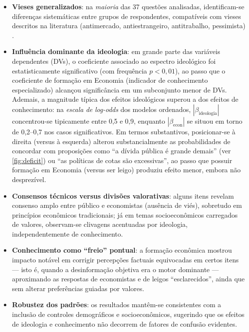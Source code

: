 \begin{itemize}
    \item \textbf{Vieses generalizados}: na \textit{maioria} das 37 questões analisadas, identificam-se diferenças sistemáticas entre grupos de respondentes, compatíveis com vieses descritos na literatura (antimercado, antiestrangeiro, antitrabalho, pessimista) \cite{The_Myth_of_the_Rational_Voter}.

    \item \textbf{Influência dominante da ideologia}: em grande parte das variáveis dependentes (DVs), o coeficiente associado ao espectro ideológico foi estatisticamente significativo (com frequência \(p<0{,}01\)), ao passo que o coeficiente de formação em Economia (indicador de conhecimento especializado) alcançou significância em um subconjunto menor de DVs. Ademais, a magnitude típica dos efeitos ideológicos superou a dos efeitos de conhecimento: na \textit{escala de log-odds} dos modelos ordenados, \(|\beta_{\text{ideologia}}|\) concentrou-se tipicamente entre 0{,}5 e 0{,}9, enquanto \(|\beta_{\text{econ}}|\) se situou em torno de 0{,}2–0{,}7 nos casos significativos. Em termos substantivos, posicionar-se à direita (versus à esquerda) alterou substancialmente as probabilidades de concordar com proposições como “a dívida pública é grande demais” (ver \autoref{fig:deficit}) ou “as políticas de cotas são excessivas”, ao passo que possuir formação em Economia (versus ser leigo) produziu efeito menor, embora não desprezível.
    
    \item \textbf{Consensos técnicos versus divisões valorativas}: alguns itens revelam consenso amplo entre público e economistas (ausência de viés), sobretudo em princípios econômicos tradicionais; já em temas socioeconômicos carregados de valores, observam-se clivagens acentuadas por ideologia, independentemente de conhecimento.
    
    \item \textbf{Conhecimento como “freio” pontual}: a formação econômica mostrou impacto notável em corrigir percepções factuais equivocadas em certos itens — isto é, quando a desinformação objetiva era o motor dominante — aproximando as respostas de economistas e de leigos “esclarecidos”, ainda que sem alterar preferências guiadas por valores.
    
    \item \textbf{Robustez dos padrões}: os resultados mantêm-se consistentes com a inclusão de controles demográficos e socioeconômicos, sugerindo que os efeitos de ideologia e conhecimento não decorrem de fatores de confusão evidentes.
\end{itemize}

